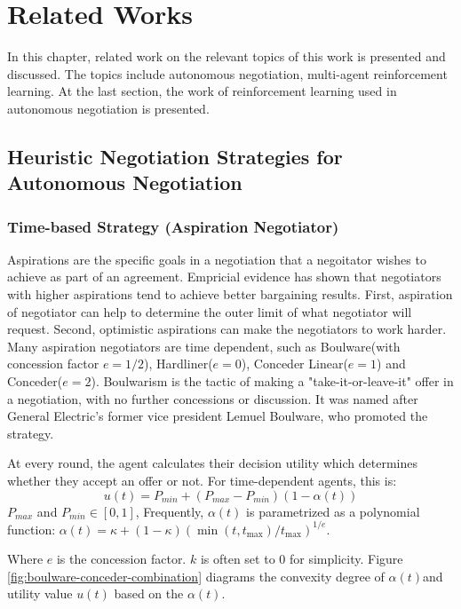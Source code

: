 \chapter{Related Works}
In this chapter, related work on the relevant topics of this work is presented and discussed. The topics include autonomous negotiation, multi-agent reinforcement learning. At the last section, the work of reinforcement learning used in autonomous negotiation is presented. 

\section{Heuristic Negotiation Strategies for Autonomous Negotiation}
\subsection{Time-based Strategy (Aspiration Negotiator)}
Aspirations are the specific goals in a negotiation that a negoitator wishes to achieve as part of an agreement. Empricial evidence has shown that negotiators with higher aspirations tend to achieve better bargaining results. First, aspiration of negotiator can help to determine the outer limit of what negotiator will request. Second, optimistic aspirations can make the negotiators to work harder\parencite{Schneider2004}. Many aspiration negotiators are time dependent, such as Boulware(with concession factor $e=1/2$), Hardliner($e=0$), Conceder Linear($e=1$) and Conceder($e=2$)\parencite{FARATIN1998159}. Boulwarism is the tactic of making a "take-it-or-leave-it" offer in a negotiation, with no further concessions or discussion. It was named after General Electric's former vice president Lemuel Boulware, who promoted the strategy\parencite{William1991}.

At every round, the agent calculates their decision utility which determines whether they accept an offer or not. For time-dependent agents, this is:
\begin{equation}
u(t) = P_{min} + (P_{max} - P_{min})(1-\alpha(t))
\end{equation}
$P_{max}$ and $P_{min} \in [0, 1]$, Frequently, $\alpha(t)$ is parametrized as a polynomial function: $\alpha(t)=\kappa+\left(1-\kappa\right)\left(\min \left(t, t_{\max }\right) / t_{\max }\right)^{1 / e}$.

Where $e$ is the concession factor. $k$ is often set to 0 for simplicity. Figure \ref{fig:boulware-conceder-combination} diagrams the convexity degree of $\alpha(t)$and utility value $u(t)$ based on the $\alpha(t)$.

